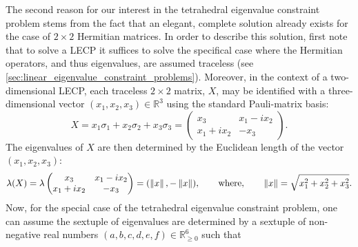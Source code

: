 \documentclass[notitlepage, 10pt]{article}
\begin{document}
The second reason for our interest in the tetrahedral eigenvalue constraint problem stems from the fact that an elegant, complete solution already exists for the case of $2\times 2$ Hermitian matrices. 
In order to describe this solution, first note that to solve a LECP it suffices to solve the specifical case where the Hermitian operators, and thus eigenvalues, are assumed traceless (see \cref{sec:linear_eigenvalue_constraint_problems}).
Moreover, in the context of a two-dimensional LECP, each traceless $2 \times 2$ matrix, $X$, may be identified with a three-dimensional vector $(x_1, x_2, x_3) \in \mathbb R^{3}$ using the standard Pauli-matrix basis:
\begin{equation}
    X = x_1 \sigma_1 + x_2 \sigma_2 + x_3 \sigma_3 = \begin{pmatrix} x_3 & x_1-ix_2 \\ x_1+ix_2 & -x_3 \end{pmatrix}.
\end{equation}
The eigenvalues of $X$ are then determined by the Euclidean length of the vector $(x_1, x_2, x_3)$:
\begin{equation}
    \lambda(X) = \lambda\begin{pmatrix} x_3 & x_1-ix_2 \\ x_1+ix_2 & -x_3 \end{pmatrix} = (\left\lVert x\right\rVert, -\left\lVert x\right\rVert), \qquad \text{where}, \qquad \left\lVert x\right\rVert = \sqrt{x_1^2 + x_2^2 + x_3^2}.
\end{equation}
Now, for the special case of the tetrahedral eigenvalue constraint problem, one can assume the sextuple of eigenvalues are determined by a sextuple of non-negative real numbers $(a,b,c,d,e,f) \in \mathbb R_{\geq 0}^{6}$ such that
\end{document}
